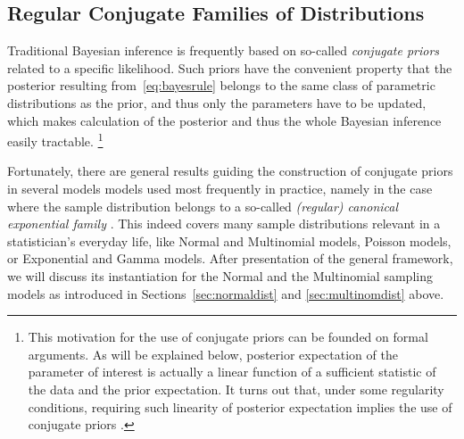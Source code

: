 \subsection{Regular Conjugate Families of Distributions}
\label{sec:regularconjugates}

Traditional Bayesian inference is frequently based on so-called \emph{conjugate priors} related to a specific likelihood.
Such priors have the convenient property that the posterior resulting from~\eqref{eq:bayesrule}
belongs to the same class of parametric distributions as the prior, and thus only the parameters have to be updated,
which makes calculation of the posterior and thus the whole Bayesian inference easily tractable.%
\footnote{This motivation for the use of conjugate priors can be founded on formal arguments.
As will be explained below, posterior expectation of the parameter of interest
is actually a linear function of a sufficient statistic of the data and the prior expectation.
It turns out that, under some regularity conditions, requiring such linearity of posterior expectation
implies the use of conjugate priors \parencite[p.~276]{2000:bernardosmith}.}

Fortunately, there are general results guiding the construction of conjugate priors in several models models used most frequently in practice,
namely in the case where the sample distribution belongs to a so-called \emph{(regular) canonical exponential family}
\parencite[pp.~202 and 272f]{2000:bernardosmith}. %
This indeed covers many sample distributions relevant in a statistician's everyday life,
like Normal and Multinomial models, Poisson models, or Exponential and Gamma models.
After presentation of the general framework, we will discuss its instantiation for the Normal
and the Multinomial sampling models as introduced in Sections~\ref{sec:normaldist} and \ref{sec:multinomdist} above.

